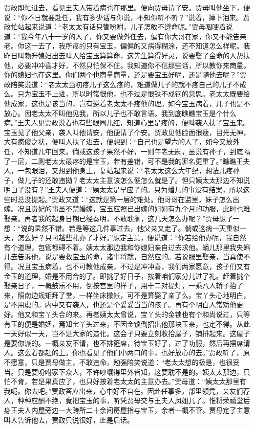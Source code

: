 \begin{parag}
    贾政即忙进去，看见王夫人带着病也在那里。便向贾母请了安。贾母叫他坐下，便说：“你不日就要赴任，我有多少话与你说，不知你听不听？”说着，掉下泪来。贾政忙站起来说道：“老太太有话只管吩咐，儿子怎敢不遵命呢。”贾母咽哽着说道：“我今年八十一岁的人了，你又要做外任去，偏有你大哥在家，你又不能告亲老。你这一去了，我所疼的只有宝玉，偏偏的又病得糊涂，还不知道怎么样呢。我昨日叫赖升媳妇出去叫人给宝玉算算命，这先生算得好灵，说要娶了金命的人帮扶他，必要冲冲喜才好，不然只怕保不住。我知道你不信那些话，所以教你来商量。你的媳妇也在这里。你们两个也商量商量，还是要宝玉好呢，还是随他去呢？”贾政陪笑说道：“老太太当初疼儿子这么疼的，难道做儿子的就不疼自己的儿子不成么。只为宝玉不上进，所以时常恨他，也不过是恨铁不成钢的意思。老太太既要给他成家，这也是该当的，岂有逆着老太太不疼他的理。如今宝玉病着，儿子也是不放心。因老太太不叫他见我，所以儿子也不敢言语。我到底瞧瞧宝玉是个什么病。”王夫人见贾政说着也有些眼圈儿红，知道心里是疼的，便叫袭人扶了宝玉来。宝玉见了他父亲，袭人叫他请安，他便请了个安。贾政见他脸面很瘦，目光无神，大有疯傻之状，便叫人扶了进去，便想到：“自己也是望六的人了，如今又放外任，不知道几年回来。倘或这孩子果然不好，一则年老无嗣，虽说有孙子，到底隔了一层，二则老太太最疼的是宝玉，若有差错，可不是我的罪名更重了。”瞧瞧王夫人，一包眼泪，又想到他身上，复站起来说：“老太太这么大年纪，想法儿疼孙子，做儿子的还敢违拗？老太太主意该怎么便怎么就是了。但只姨太太那边不知说明白了没有？”王夫人便道：“姨太太是早应了的。只为蟠儿的事没有结案，所以这些时总没提起。”贾政又道：“这就是第一层的难处。他哥哥在监里，妹子怎么出嫁。况且贵妃的事虽不禁婚嫁，宝玉应照已出嫁的姐姐有九个月的功服，此时也难娶亲。再者我的起身日期已经奏明，不敢耽搁，这几天怎么办呢？”贾母想了一想：“说的果然不错。若是等这几件事过去，他父亲又走了。倘或这病一天重似一天，怎么好？只可越些礼办了才好。”想定主意，便说道：“你若给他办呢，我自然有个道理，包管都碍不着。姨太太那边我和你媳妇亲自过去求他。蟠儿那里我央蝌儿去告诉他，说是要救宝玉的命，诸事将就，自然应的。若说服里娶亲，当真使不得。况且宝玉病着，也不可教他成亲，不过是冲冲喜，我们两家愿意，孩子们又有金玉的道理，婚是不用合的了。即挑了好日子，按着咱们家分儿过了礼。赶着挑个娶亲日子，一概鼓乐不用，倒按宫里的样子，用十二对提灯，一乘八人轿子抬了来，照南边规矩拜了堂，一样坐床撒帐，可不是算娶了亲了么。宝丫头心地明白，是不用虑的。内中又有袭人，也还是个妥妥当当的孩子。再有个明白人常劝他更好。他又和宝丫头合的来。再者姨太太曾说，宝丫头的金锁也有个和尚说过，只等有玉的便是婚姻，焉知宝丫头过来，不因金锁倒招出他那块玉来，也定不得。从此一天好似一天，岂不是大家的造化。这会子只要立刻收拾屋子，铺排起来。这屋子是要你派的。一概亲友不请，也不排筵席，待宝玉好了，过了功服，然后再摆席请人。这么着都赶的上。你也看见了他们小两口的事，也好放心的去。”贾政听了，原不愿意，只是贾母做主，不敢违命，勉强陪笑说道：“老太太想的极是，也很妥当。只是要吩咐家下众人，不许吵嚷得里外皆知，这要耽不是的。姨太太那边，只怕不肯，若是果真应了，也只好按着老太太的主意办去。”贾母道：“姨太太那里有我呢。你去吧。”贾政答应出来，心中好不自在。因赴任事多，部里领凭，亲友们荐人，种种应酬不绝，竟把宝玉的事，听凭贾母交与王夫人凤姐儿了。惟将荣禧堂后身王夫人内屋旁边一大跨所二十余间房屋指与宝玉，余者一概不管。贾母定了主意叫人告诉他去，贾政只说很好，此是后话。
\end{parag}


